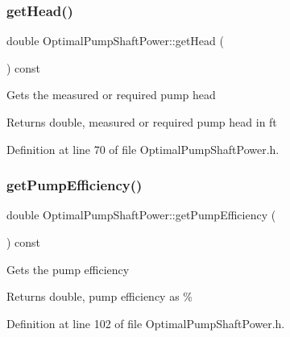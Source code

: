 \mbox{\label{class_optimal_pump_shaft_power_abb285a8a256c10187113c34db1a4462b}} 
\subsubsection{\texorpdfstring{get\+Head()}{getHead()}}
{\footnotesize\ttfamily double Optimal\+Pump\+Shaft\+Power\+::get\+Head (\begin{DoxyParamCaption}{ }\end{DoxyParamCaption}) const\hspace{0.3cm}{\ttfamily [inline]}}

Gets the measured or required pump head \begin{DoxyReturn}{Returns}
double, measured or required pump head in ft 
\end{DoxyReturn}


Definition at line 70 of file Optimal\+Pump\+Shaft\+Power.\+h.

\mbox{\label{class_optimal_pump_shaft_power_a77b9c639438f9d6008c20948f173a2c4}} 
\subsubsection{\texorpdfstring{get\+Pump\+Efficiency()}{getPumpEfficiency()}}
{\footnotesize\ttfamily double Optimal\+Pump\+Shaft\+Power\+::get\+Pump\+Efficiency (\begin{DoxyParamCaption}{ }\end{DoxyParamCaption}) const\hspace{0.3cm}{\ttfamily [inline]}}

Gets the pump efficiency \begin{DoxyReturn}{Returns}
double, pump efficiency as \% 
\end{DoxyReturn}


Definition at line 102 of file Optimal\+Pump\+Shaft\+Power.\+h.

\mbox{\label{class_optimal_pump_shaft_power_a607d32c56edece639e03007adc1bf325}} 
